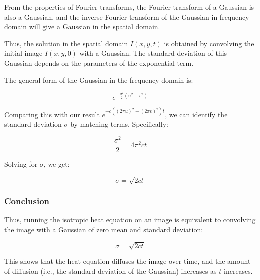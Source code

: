 \documentclass{article}
\begin{document}
From the properties of Fourier transforms, the Fourier transform of a Gaussian is also a Gaussian, and the inverse Fourier transform of the Gaussian in frequency domain will give a Gaussian in the spatial domain.
\vspace{5pt}

Thus, the solution in the spatial domain \( I(x, y, t) \) is obtained by convolving the initial image \( I(x, y, 0) \) with a Gaussian. The standard deviation of this Gaussian depends on the parameters of the exponential term.


The general form of the Gaussian in the frequency domain is:

\[
e^{-\frac{\sigma^2}{2} \left( u^2 + v^2 \right)}
\]

Comparing this with our result \( e^{-c \left( (2 \pi u)^2 + (2 \pi v)^2 \right) t} \), we can identify the standard deviation \( \sigma \) by matching terms. Specifically:

\[
\frac{\sigma^2}{2} = 4 \pi^2 c t
\]

Solving for \( \sigma \), we get:

\[
\sigma = \sqrt{2 c t}
\]

\subsubsection*{Conclusion}

Thus, running the isotropic heat equation on an image is equivalent to convolving the image with a Gaussian of zero mean and standard deviation:

\[
\sigma = \sqrt{2 c t}
\]

This shows that the heat equation diffuses the image over time, and the amount of diffusion (i.e., the standard deviation of the Gaussian) increases as \( t \) increases.
\end{document}
